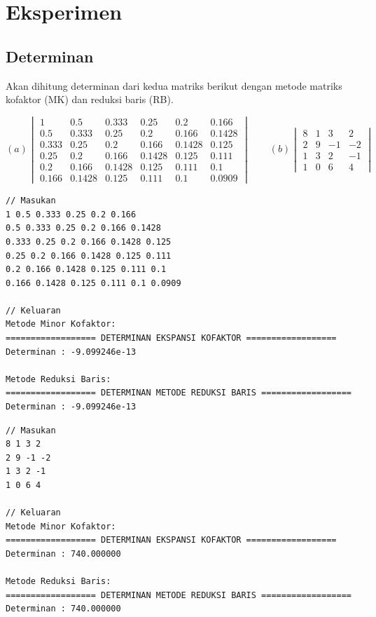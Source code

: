 \section{Eksperimen}

\subsection{Determinan}
Akan dihitung determinan dari kedua matriks berikut dengan metode matriks kofaktor (MK) dan reduksi baris (RB).

\[ (a) \begin{vmatrix}
1     & 0.5    & 0.333  & 0.25   & 0.2    & 0.166 \\
0.5   & 0.333  & 0.25   & 0.2    & 0.166  & 0.1428 \\
0.333 & 0.25   & 0.2    & 0.166  & 0.1428 & 0.125 \\
0.25  & 0.2    & 0.166  & 0.1428 & 0.125  & 0.111 \\
0.2   & 0.166  & 0.1428 & 0.125  & 0.111  & 0.1 \\
0.166 & 0.1428 & 0.125  & 0.111  & 0.1    & 0.0909 
\end{vmatrix} \qquad (b) 
\begin{vmatrix}
8 & 1 & 3  &2 \\
2 & 9 & -1 & -2 \\
1 & 3 & 2  &-1 \\
1 & 0 & 6  &4 
\end{vmatrix}\]

\begin{lstlisting}[caption = Determinan]
// Masukan
1 0.5 0.333 0.25 0.2 0.166
0.5 0.333 0.25 0.2 0.166 0.1428
0.333 0.25 0.2 0.166 0.1428 0.125
0.25 0.2 0.166 0.1428 0.125 0.111
0.2 0.166 0.1428 0.125 0.111 0.1
0.166 0.1428 0.125 0.111 0.1 0.0909

// Keluaran
Metode Minor Kofaktor:
================== DETERMINAN EKSPANSI KOFAKTOR ==================
Determinan : -9.099246e-13

Metode Reduksi Baris:
================== DETERMINAN METODE REDUKSI BARIS ==================
Determinan : -9.099246e-13
\end{lstlisting}

\begin{lstlisting}[caption = Determinan]
// Masukan
8 1 3 2
2 9 -1 -2
1 3 2 -1
1 0 6 4

// Keluaran
Metode Minor Kofaktor:
================== DETERMINAN EKSPANSI KOFAKTOR ==================
Determinan : 740.000000

Metode Reduksi Baris:
================== DETERMINAN METODE REDUKSI BARIS ==================
Determinan : 740.000000
\end{lstlisting}

